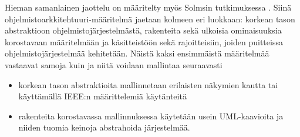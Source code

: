 \documentclass[finnish]{tktltiki2}
\theoremstyle{definition}
\theoremstyle{remark}
\begin{document}


Hieman samanlainen jaottelu on määritelty myös Solmsin tutkimuksessa \citep[s. 368-369]{solms_what_2012}. Siinä ohjelmistoarkkitehtuuri-määritelmä jaetaan kolmeen eri luokkaan: korkean tason abstraktioon ohjelmistojärjestelmästä, rakenteita sekä ulkoisia ominaisuuksia korostavaan määritelmään ja käsitteistöön sekä rajoitteisiin, joiden puitteissa ohjelmistojärjestelmää kehitetään. Näistä kaksi ensimmäistä määritelmää vastaavat samoja kuin \cite{gorton_understanding_2011} ja niitä voidaan mallintaa seuraavasti

\begin{itemize}
	\item korkean tason abstraktioita mallinnetaan erilaisten näkymien kautta tai käyttämällä IEEE:n määrittelemiä käytänteitä \citep[s. 4-5]{ieee_2000}
	\item rakenteita korostavassa mallinnuksessa käytetään usein UML-kaavioita ja niiden tuomia keinoja abstrahoida järjestelmää.
	
\end{itemize}

\end{document}
